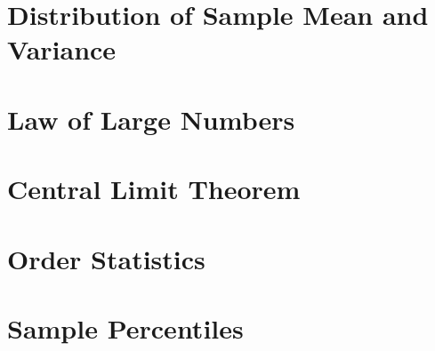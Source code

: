\section{Distribution of Sample Mean and Variance}

\section{Law of Large Numbers}

\section{Central Limit Theorem}

\section{Order Statistics}

\section{Sample Percentiles}

